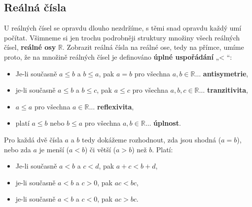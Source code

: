     \subsection{Reálná čísla}\label{mai:IchapIIsecIIsubI}
      U reálných čísel se opravdu dlouho nezdržíme, s těmi snad opravdu každý umí počítat. Všimneme
      si jen trochu podrobněji struktury množiny všech reálných čísel, \textbf{reálné osy}
      \(\mathbb{R}\). Zobrazit  reálná čísla na reálné ose, tedy na přímce, umíme proto, že na
      množině reálných čísel je definováno \textbf{úplné uspořádání} „< “:
      \begin{itemize}[noitemsep]
        \item Je-li současně \(a ≤ b\) a \(b ≤ a\), pak \(a = b\) 
              pro všechna \(a, b\in\mathbb{R}\ldots\) \textbf{antisymetrie},
        \item je-li současně \(a ≤ b\) a \(b ≤ c\), pak \(a ≤ c\) 
              pro všechna \(a,b,c\in\mathbb{R}\ldots\) \textbf{tranzitivita},
        \item \(a ≤ a\) pro všechna \(a\in\mathbb{R}\ldots\) \textbf{reflexivita},
        \item platí \(a ≤ b\) nebo \(b ≤ a\) pro všechna \(a, b \in\mathbb{R}\ldots\) 
              \textbf{úplnost}.
      \end{itemize}
      Pro každá dvě čísla \(a\) a \(b\) tedy dokážeme rozhodnout, zda jsou shodná (\(a = b\)), nebo 
      zda \(a\) je menší (\(a < b\)) či větší (\(a > b\)) než \(b\). Platí:
      \begin{itemize}[noitemsep]
        \item Je-li současně \(a < b\) a \(c < d\), pak \(a + c < b + d\),
        \item je-li současně \(a < b\) a \(c > 0\), pak \(ac < bc\),
        \item je-li současně \(a < b\) a \(c < 0\), pak \(ac > bc\).
      \end{itemize}
      
